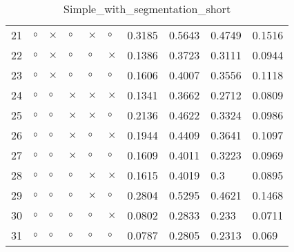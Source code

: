 \begin{table}[H]
\begin{tabular}{|P{0.7cm}|P{1.3cm}P{1.3cm}P{1.3cm}P{1.3cm}P{1.3cm}|P{1.1cm}P{1.1cm}P{1.1cm}P{1.1cm}|}
  21 &  $\circ$ & $\times$ &  $\circ$ & $\times$ &     $\circ$ &          0.3185 &        0.5643 &          0.4749 &          0.1516 \\
  22 &  $\circ$ & $\times$ &  $\circ$ &  $\circ$ &    $\times$ &          0.1386 &        0.3723 &          0.3111 &          0.0944 \\
  23 &  $\circ$ & $\times$ &  $\circ$ &  $\circ$ &     $\circ$ &          0.1606 &        0.4007 &          0.3556 &          0.1118 \\
  24 &  $\circ$ &  $\circ$ & $\times$ & $\times$ &    $\times$ &          0.1341 &        0.3662 &          0.2712 &          0.0809 \\
  25 &  $\circ$ &  $\circ$ & $\times$ & $\times$ &     $\circ$ &          0.2136 &        0.4622 &          0.3324 &          0.0986 \\
  26 &  $\circ$ &  $\circ$ & $\times$ &  $\circ$ &    $\times$ &          0.1944 &        0.4409 &          0.3641 &          0.1097 \\
  27 &  $\circ$ &  $\circ$ & $\times$ &  $\circ$ &     $\circ$ &          0.1609 &        0.4011 &          0.3223 &          0.0969 \\
  28 &  $\circ$ &  $\circ$ &  $\circ$ & $\times$ &    $\times$ &          0.1615 &        0.4019 &             0.3 &          0.0895 \\
  29 &  $\circ$ &  $\circ$ &  $\circ$ & $\times$ &     $\circ$ &          0.2804 &        0.5295 &          0.4621 &          0.1468 \\
  30 &  $\circ$ &  $\circ$ &  $\circ$ &  $\circ$ &    $\times$ &          0.0802 &        0.2833 &           0.233 &          0.0711 \\
  31 &  $\circ$ &  $\circ$ &  $\circ$ &  $\circ$ &     $\circ$ &          0.0787 &        0.2805 &          0.2313 &           0.069 \\
\hline
\end{tabular}
\caption{Simple_with_segmentation_short}
\label{tab:}
\end{table}
